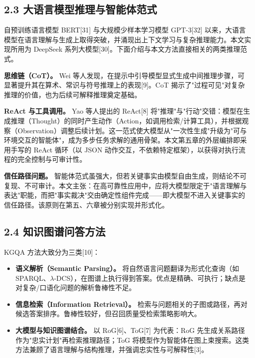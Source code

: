 \documentclass[12pt,a4paper]{ctexart}
\begin{document}
\subsection*{2.3 大语言模型推理与智能体范式}

自预训练语言模型 BERT[31] 与大规模少样本学习模型 GPT-3[32] 以来，大语言模型在语言理解与生成上取得突破，并涌现出上下文学习与复杂推理能力。本文实现所用为 DeepSeek 系列大模型[30]。下面介绍与本文方法直接相关的两类推理范式。

\textbf{思维链（CoT）。} Wei 等人发现，在提示中引导模型显式生成中间推理步骤，可显著提升其在算术、常识与符号推理上的表现[9]。CoT 揭示了"过程可见"对复杂推理的价值，也为后续可解释推理奠定基础。

\textbf{ReAct 与工具调用。} Yao 等人提出的 ReAct[8] 将"推理"与"行动"交错：模型在生成推理（Thought）的同时产生动作（Action，如调用检索/计算工具），并根据观察（Observation）调整后续计划。这一范式使大模型从"一次性生成"升级为"可与环境交互的智能体"，成为多步任务求解的通用骨架。本文第五章的外层编排即采用手写的 ReAct 循环（以 JSON 动作交互，不依赖特定框架），以获得对执行流程的完全控制与可审计性。

\textbf{信任路径问题。} 智能体范式虽强大，但若关键事实由模型自由生成，则结论不可复现、不可审计。本文主张：在高可靠性应用中，应将大模型限定于"语言理解与表达"职能，而把"事实裁决"交由确定性组件完成——即大模型不进入关键事实的信任路径。该原则在第五、六章被分别实现并形式化。

\subsection*{2.4 知识图谱问答方法}

KGQA 方法大致分为三类[10]：

\begin{itemize}[leftmargin=2em]
\item \textbf{语义解析（Semantic Parsing）。} 将自然语言问题翻译为形式化查询（如 SPARQL、$\lambda$-DCS），在图谱上执行得到答案。优点是精确、可执行；缺点是对复杂/口语化问题的解析鲁棒性不足。
\item \textbf{信息检索（Information Retrieval）。} 检索与问题相关的子图或路径，再对候选答案排序。鲁棒性较好，但召回质量受检索策略影响大。
\item \textbf{大模型与知识图谱结合。} 以 RoG[6]、ToG[7] 为代表：RoG 先生成关系路径作为"忠实计划"再检索推理路径；ToG 将模型作为智能体在图上束搜索。这类方法兼顾了语言理解与结构推理，并强调忠实性与可解释性[3]。
\end{itemize}
\end{document}
